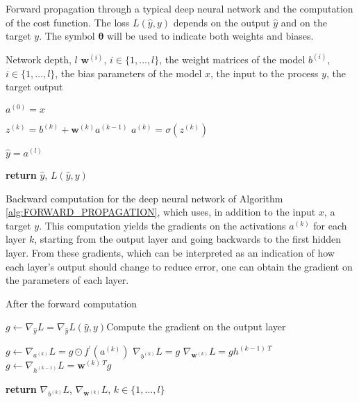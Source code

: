 \begin{algorithm}[H]
\caption{Forward propagation through a typical deep neural network and the computation of the cost function. The loss $L(\hat{y},y)$ depends on the output $\hat{y}$ and on the target $y$. The symbol $\bm{\theta}$ will be used to indicate both weights and biases.}\label{alg:FORWARD_PROPAGATION}
\begin{algorithmic}[1]
\Require Network depth, $l$
\Require $\mathbf{w}^{(i)}$, $i \in \{1,\dots,l\}$, the weight matrices of the model
\Require $b^{(i)}$, $i \in \{1,\dots,l\}$, the bias parameters of the model
\Require $x$, the input to the process
\Require $y$, the target output


\State $a^{(0)} = x$

\State $z^{(k)} = b^{(k)} + \mathbf{w}^{(k)} a^{(k-1)}$
\State $a^{(k)} = \sigma(z^{(k)})$
\EndFor

\State $\hat{y} = a^{(l)}$

\State \textbf{return} $\hat{y}$, $L(\hat{y},y)$
\EndProcedure
\end{algorithmic}
\end{algorithm}


\begin{algorithm}[H]
\caption{Backward computation for the deep neural network of Algorithm \ref{alg:FORWARD_PROPAGATION}, which uses, in addition to the input $x$, a target $y$. This computation yields the gradients on the activations $a^{(k)}$ for each layer $k$, starting from the output layer and going backwards to the first hidden layer. From these gradients, which can be interpreted as an indication of how each layer's output should change to reduce error, one can obtain the gradient on the parameters of each layer.}\label{alg:BACKWARD_COMPUTATION}
\begin{algorithmic}[1]
 \Comment After the forward computation

\State $g \gets \nabla_{\hat{y}}L = \nabla_{\hat{y}}L(\hat{y},y)$\Comment Compute the gradient on the output layer

\State $g \gets \nabla_{a^{(k)}}L = g \odot f^{\prime}(a^{(k)})$
\State $\nabla_{b^{(k)}}L = g$
\State $\nabla_{\mathbf{w}^{(k)}}L = g h^{(k-1)~T}$
\State $g \gets \nabla_{h^{(k-1)}}L = \mathbf{w}^{(k)~T} g$
\EndFor

\State \textbf{return} $\nabla_{b^{(k)}}L$, $\nabla_{\mathbf{w}^{(k)}}L$, $k \in \{1,\dots,l\}$
\EndProcedure
\end{algorithmic}
\end{algorithm}





